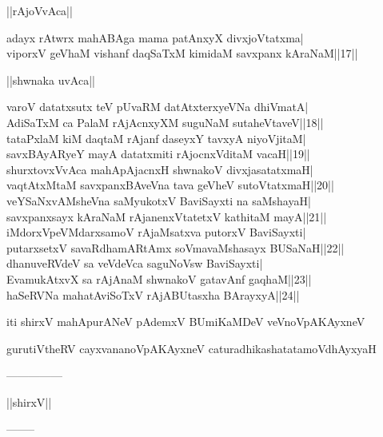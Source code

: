 \documentclass{article}
\begin{document}
\begin{center}
||rAjoVvAca||
\end{center}

adayx rAtwrx mahABAga mama patAnxyX divxjoVtatxma|\\
viporxV geVhaM vishanf daqSaTxM kimidaM savxpanx kAraNaM||17||\\

\begin{center}
||shwnaka uvAca||
\end{center}

varoV datatxsutx teV pUvaRM datAtxterxyeVNa dhiVmatA|\\
AdiSaTxM ca PalaM rAjAcnxyXM suguNaM sutaheVtaveV||18||\\
tataPxlaM kiM daqtaM rAjanf daseyxY tavxyA niyoVjitaM|\\
savxBAyARyeY mayA datatxmiti rAjocnxVditaM vacaH||19||\\
shurxtovxVvAca mahApAjacnxH shwnakoV divxjasatatxmaH|\\
vaqtAtxMtaM savxpanxBAveVna tava geVheV sutoVtatxmaH||20||\\
veYSaNxvAMsheVna saMyukotxV BaviSayxti na saMshayaH|\\
savxpanxsayx kAraNaM rAjanenxVtatetxV kathitaM mayA||21||\\
iMdorxVpeVMdarxsamoV rAjaMsatxva putorxV BaviSayxti|\\
putarxsetxV savaRdhamARtAmx soVmavaMshasayx BUSaNaH||22||\\
dhanuveRVdeV sa veVdeVca saguNoVsw BaviSayxti|\\
EvamukAtxvX sa rAjAnaM shwnakoV gatavAnf gaqhaM||23||\\
haSeRVNa mahatAviSoTxV rAjABUtasxha BArayxyA||24||

\begin{center}
iti shirxV mahApurANeV pAdemxV BUmiKaMDeV veVnoVpAKAyxneV
\end{center}

\begin{center}
gurutiVtheRV cayxvananoVpAKAyxneV caturadhikashatatamoVdhAyxyaH
\end{center}

\begin{center}
---------------
\end{center}

\begin{center}
||shirxV||
\end{center}

\begin{center}
--------
\end{center}
\end{document}
